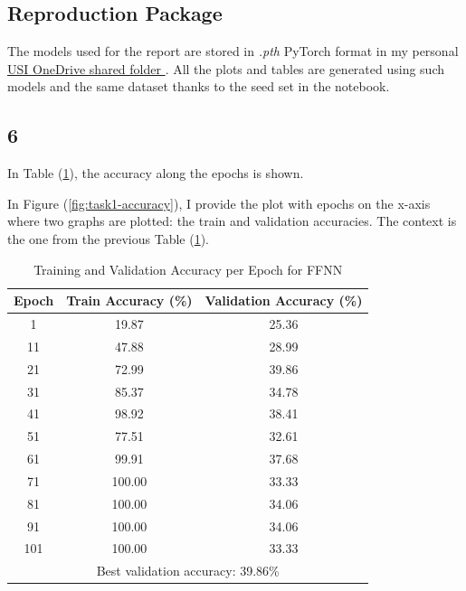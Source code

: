 \documentclass[11pt]{scrartcl}
\begin{document}
\subsection*{Reproduction Package}

The models used for the report are stored in \textit{.pth} PyTorch format
in my personal 
\href{https://usi365-my.sharepoint.com/:f:/g/personal/moralj_usi_ch/EjFmZ00gxlVNtqGCawGJx9sBzvia6ry5RqAWAV4rOLi3CA?e=rTWhEa}{
	USI OneDrive shared folder
}.
All the plots and tables are generated using such models 
and the same dataset thanks to the seed set in the notebook.


\subsection*{6}

In Table (\ref{tab:task1-accuracy}),
the accuracy along the epochs is shown.

In Figure (\ref{fig:task1-accuracy}), 
I provide the plot with epochs on the x-axis where two graphs are plotted:
the train and validation accuracies.
The context is the one from the previous Table (\ref{tab:task1-accuracy}). 


\begin{table}[htbp]
\centering
\caption{Training and Validation Accuracy per Epoch for FFNN}
\begin{tabular}{ccc}
\toprule
\textbf{Epoch} & \textbf{Train Accuracy (\%)} & \textbf{Validation Accuracy (\%)} \\
\midrule
1    & 19.87  & 25.36  \\
11   & 47.88  & 28.99  \\
21   & 72.99  & 39.86  \\
31   & 85.37  & 34.78  \\
41   & 98.92  & 38.41  \\
51   & 77.51  & 32.61  \\
61   & 99.91  & 37.68  \\
71   & 100.00 & 33.33  \\
81   & 100.00 & 34.06  \\
91   & 100.00 & 34.06  \\
101  & 100.00 & 33.33  \\
\midrule
\multicolumn{3}{c}{Best validation accuracy: 39.86\%} \\
\bottomrule
\end{tabular}
\label{tab:task1-accuracy}
\end{table}
\end{document}
